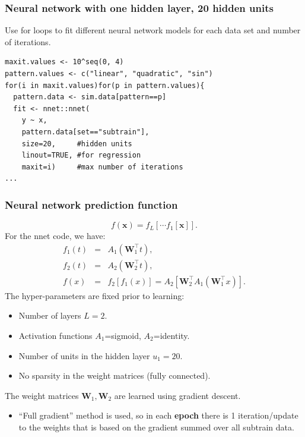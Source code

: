 \documentclass{beamer}
\begin{document}
\begin{frame}[fragile]
  \frametitle{Neural network with one hidden layer, 20 hidden units}

  Use for loops to fit different neural network models for each data
  set and number of iterations. 

\begin{verbatim}
maxit.values <- 10^seq(0, 4)
pattern.values <- c("linear", "quadratic", "sin")
for(i in maxit.values)for(p in pattern.values){
  pattern.data <- sim.data[pattern==p]
  fit <- nnet::nnet(
    y ~ x,
    pattern.data[set=="subtrain"],
    size=20,     #hidden units
    linout=TRUE, #for regression
    maxit=i)     #max number of iterations
...
\end{verbatim}

\end{frame}

\begin{frame}
  \frametitle{Neural network prediction function}
\begin{equation*}
  f(\mathbf x) = f_L[\cdots f_1[\mathbf x] ].
\end{equation*}
For the nnet code, we have:
\begin{eqnarray*}
  f_1(t) &=& A_1( \mathbf W_1^\intercal t ), \\
  f_2(t) &=& A_2( \mathbf W_2^\intercal t ), \\
  f(x) &=& f_2[ f_1(x) ] = A_2[ \mathbf W_2^\intercal A_1( \mathbf W_1^\intercal x ) ].
\end{eqnarray*}
The hyper-parameters are fixed prior to learning:
\begin{itemize}
\item Number of layers $L=2$.
\item Activation functions $A_1$=sigmoid, $A_2$=identity.
\item Number of units in the hidden layer $u_1=20$.
\item No sparsity in the weight matrices (fully connected).
\end{itemize}
The weight matrices $\mathbf W_1,\mathbf W_2$ are learned using
gradient descent.
\begin{itemize}
\item ``Full gradient'' method is used, so in each \textbf{epoch}
  there is 1 iteration/update to the weights that is based on the
  gradient summed over all subtrain data.
\end{itemize}

\end{frame}
\end{document}
